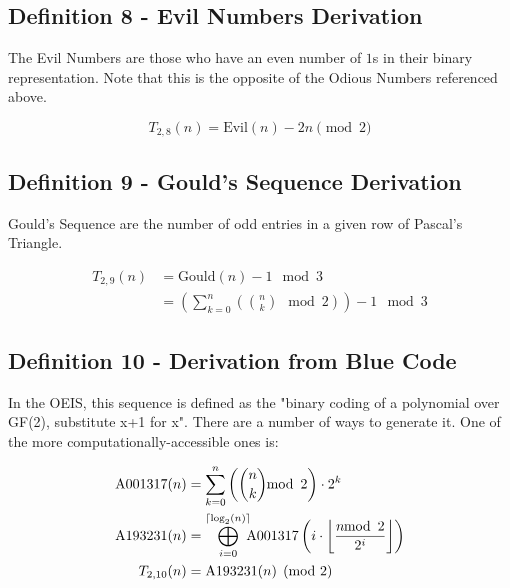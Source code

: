 \documentclass[conference]{IEEEtran}
\begin{document}
\subsection{Definition 8 - Evil Numbers Derivation}


The Evil Numbers \cite{OEIS-Evil} are those who have an even number of $1$s in their binary representation. Note that this is the opposite of the Odious Numbers referenced above.

\begin{equation}
T_{2,8}(n) = \text{Evil}(n) - 2n \pmod{2}
\end{equation}

\subsection{Definition 9 - Gould's Sequence Derivation}


Gould's Sequence \cite{OEIS-Gould} are the number of odd entries in a given row of Pascal's Triangle.


\begin{equation}
    \begin{aligned}
T_{2,9}(n) &= \text{Gould}(n) - 1 \mod{3} \\
           &= \left(\sum_{k=0}^n \left(\binom{n}{k} \mod{2} \right)\right) - 1 \mod{3}
    \end{aligned}
\end{equation}

\subsection{Definition 10 - Derivation from Blue Code}


In the OEIS, this sequence \cite{OEIS-A193231} is defined as the "binary coding of a polynomial over GF(2), substitute x+1 for x". There are a number of ways to generate it. One of the more computationally-accessible ones is:

\begin{equation}
    \begin{aligned}
\text{A001317}(n) &= \sum_{k=0}^n \left(\binom{n}{k} \mod{2} \right) \cdot 2^k \\
\text{A193231}(n) &= \bigoplus_{i=0}^{\ceil{\log_2(n)}} \hspace{-5pt} \text{A001317}\left(i \cdot \floor{\dfrac{n \mod{2}}{2^i}}\right) \\
      T_{2,10}(n) &= \text{A193231}(n) \pmod{2}
    \end{aligned}
\end{equation}
\end{document}
